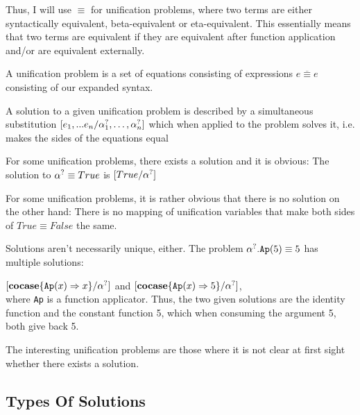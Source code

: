 \documentclass[twoside,12pt,a4paper]{article}
\begin{document}
Thus, I will use $\equiv$ for unification problems, where two terms are either syntactically equivalent, beta-equivalent or eta-equivalent.
This essentially means that two terms are equivalent if they are equivalent after function application and/or are equivalent externally.

\begin{definition}
    A unification problem is a set of equations consisting of expressions $\overline{e \equiv e}$ consisting of our expanded syntax.
\end{definition}

\begin{definition}[Solution]
    A solution to a given unification problem is described by a simultaneous substitution $[e_1,...e_n / \alpha^?_1, \dots, \alpha^?_n]$
    which when applied to the problem solves it, i.e. makes the sides of the equations equal %
\end{definition}


For some unification problems, there exists a solution and it is obvious:
The solution to $\alpha^? \equiv True$ is $[True/\alpha^?]$

For some unification problems, it is rather obvious that there is no solution on the other hand:
There is no mapping of unification variables that make both sides of $True \equiv False$ the same.

Solutions aren't necessarily unique, either. The problem $\alpha^?.\texttt{Ap}(5) \equiv 5$ has multiple solutions: 

$[\textbf{cocase}\{\texttt{Ap}(x)\Rightarrow x\} / \alpha^?]$ and $[\textbf{cocase}\{\texttt{Ap}(x)\Rightarrow 5\} / \alpha^?]$,\\
where \texttt{Ap} is a function applicator. 
Thus, the two given solutions are the identity function and the constant function 5, which when consuming the argument 5, both give back 5.

The interesting unification problems are those where it is not clear at first sight whether there exists a solution.




\subsection{Types Of Solutions} %
\end{document}
